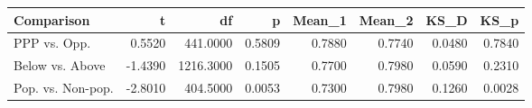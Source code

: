 \begin{tabular}{lrrrrrrr}
  \toprule
Comparison & t & df & p & Mean_1 & Mean_2 & KS_D & KS_p \\ 
  \midrule
PPP vs. Opp. & 0.5520 & 441.0000 & 0.5809 & 0.7880 & 0.7740 & 0.0480 & 0.7840 \\ 
  Below vs. Above & -1.4390 & 1216.3000 & 0.1505 & 0.7700 & 0.7980 & 0.0590 & 0.2310 \\ 
  Pop. vs. Non-pop. & -2.8010 & 404.5000 & 0.0053 & 0.7300 & 0.7980 & 0.1260 & 0.0028 \\ 
   \bottomrule
\end{tabular}
